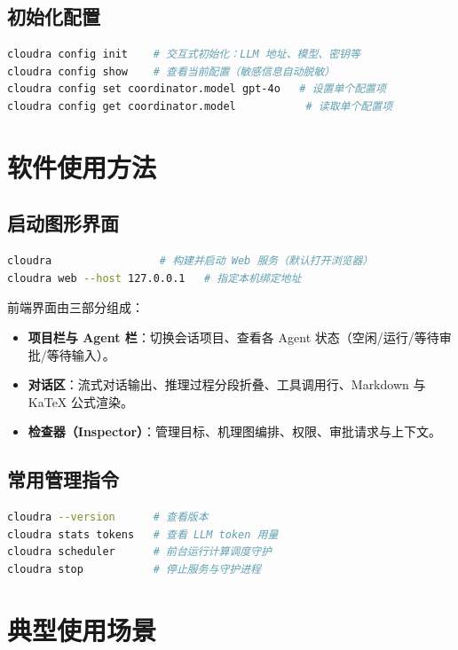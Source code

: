 \documentclass[zihao=-4,a4paper,fontset=none]{ctexart}
\begin{document}
\subsection{初始化配置}
\begin{lstlisting}[language=bash]
cloudra config init    # 交互式初始化：LLM 地址、模型、密钥等
cloudra config show    # 查看当前配置（敏感信息自动脱敏）
cloudra config set coordinator.model gpt-4o   # 设置单个配置项
cloudra config get coordinator.model           # 读取单个配置项
\end{lstlisting}

\section{软件使用方法}

\subsection{启动图形界面}
\begin{lstlisting}[language=bash]
cloudra                 # 构建并启动 Web 服务（默认打开浏览器）
cloudra web --host 127.0.0.1   # 指定本机绑定地址
\end{lstlisting}

前端界面由三部分组成：
\begin{itemize}[itemsep=2pt]
  \item \textbf{项目栏与 Agent 栏}：切换会话项目、查看各 Agent 状态（空闲/运行/等待审批/等待输入）。
  \item \textbf{对话区}：流式对话输出、推理过程分段折叠、工具调用行、Markdown 与 KaTeX 公式渲染。
  \item \textbf{检查器（Inspector）}：管理目标、机理图编排、权限、审批请求与上下文。
\end{itemize}

\subsection{常用管理指令}
\begin{lstlisting}[language=bash]
cloudra --version      # 查看版本
cloudra stats tokens   # 查看 LLM token 用量
cloudra scheduler      # 前台运行计算调度守护
cloudra stop           # 停止服务与守护进程
\end{lstlisting}

\section{典型使用场景}
\end{document}
